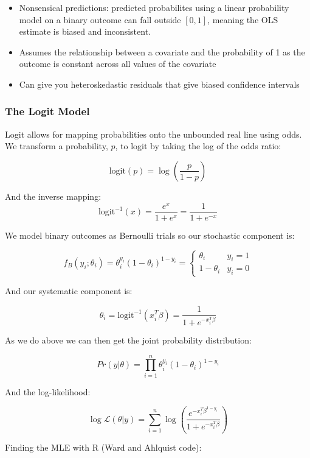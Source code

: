 \documentclass[
]{article}
\providecommand{\tightlist}{%
  \setlength{\itemsep}{0pt}\setlength{\parskip}{0pt}}
\begin{document}
\begin{itemize}
\tightlist
\item
  Nonsensical predictions: predicted probabilites using a linear
  probability model on a binary outcome can fall outside \([0,1]\),
  meaning the OLS estimate is biased and inconsistent.
\item
  Assumes the relationship between a covariate and the probability of 1
  as the outcome is constant across all values of the covariate
\item
  Can give you heteroskedastic residuals that give biased confidence
  intervals
\end{itemize}

\hypertarget{the-logit-model}{%
\subsubsection{The Logit Model}\label{the-logit-model}}

Logit allows for mapping probabilities onto the unbounded real line
using odds. We transform a probability, \(p\), to logit by taking the
log of the odds ratio:

\[\mathrm{logit}(p)=\log(\frac{p}{1-p})\]

And the inverse mapping:\\

\[
\mathrm{logit}^{-1}(x)=\frac{e^x}{1+e^x}=\frac{1}{1+e^{-x}}
\]

We model binary outcomes as Bernoulli trials so our stochastic component
is:

\[
f_B(y_i;\theta_i)=\theta_i^{y_i}(1-\theta_i)^{1-y_i}= 
   \left\{
\begin{array}{ll}
      \theta_i & y_i=1 \\
      1-\theta_i & y_i=0
\end{array} 
\right. 
\]

And our systematic component is:

\[
\theta_i=\mathrm{logit}^{-1}(x_i^T\beta)=\frac{1}{1+e^{-x_i^T\beta}}
\]

As we do above we can then get the joint probability distribution:

\[
Pr(y|\theta)=\prod_{i=1}^n \theta_i^{y_i}(1-\theta_i)^{1-y_i}
\]

And the log-likelihood:

\[
\log\mathcal{L}(\theta|y)=\sum_{i=1}^n\log(\frac{e^{-x_i^T\beta^{1-y_i}}}{1+e^{-x_i^T\beta}})
\]

Finding the MLE with R (Ward and Ahlquist code):
\end{document}
